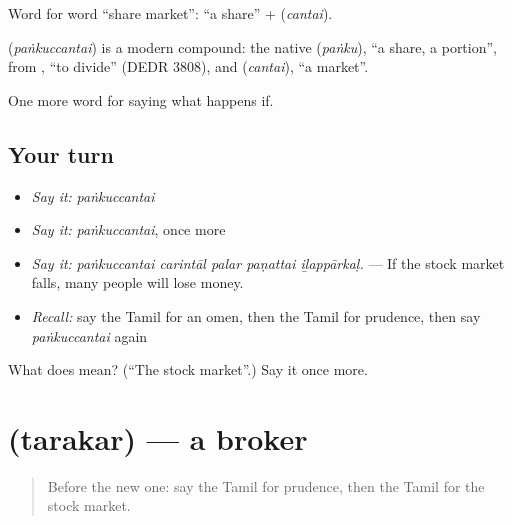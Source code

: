 Word for word \textquotedblleft{}share market\textquotedblright{}:  \textquotedblleft{}a share\textquotedblright{} +  (\emph{cantai}).

\begin{cousinweb}
\textbf{} (\emph{paṅkuccantai}) is a modern compound: the native  (\emph{paṅku}), \textquotedblleft{}a share, a portion\textquotedblright{}, from , \textquotedblleft{}to divide\textquotedblright{} (DEDR 3808), and  (\emph{cantai}), \textquotedblleft{}a market\textquotedblright{}.
\end{cousinweb}

\begin{grammarlens}[title={What you've built}]
One more word for saying what happens if.
\end{grammarlens}

\subsection*{Your turn}
\begin{itemize}
\raggedright
  \item \emph{Say it:} \emph{paṅkuccantai}
  \item \emph{Say it:} \emph{paṅkuccantai}, once more
  \item \emph{Say it:} \emph{paṅkuccantai carintāl palar paṇattai iḻappārkaḷ.} — If the stock market falls, many people will lose money.
  \item \emph{Recall:} say the Tamil for an omen, then the Tamil for prudence, then say \emph{paṅkuccantai} again
\end{itemize}

\begin{tcolorbox}[breakable,colback=teal!4,colframe=teal!35!black,title={Before you move on}]
What does  mean? (\textquotedblleft{}The stock market\textquotedblright{}.) Say it once more.
\end{tcolorbox}
\section[\texorpdfstring{\ta{தரகர்} (tarakar)}{தரகர் (tarakar)}]{ (tarakar) — a broker}

\label{lesson:TA-C545-tarakar}



\begin{quote}
Before the new one: say the Tamil for prudence, then the Tamil for the stock market.
\end{quote}


